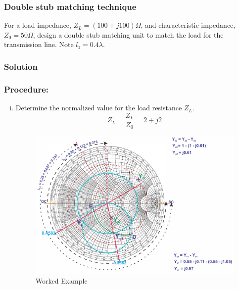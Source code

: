 \begin{exmp}
\subsubsection*{Double stub matching technique}
For a load impedance, $Z_{L} = (100 + j100)\Omega$, and characteristic impedance, $Z_0 = 50\Omega$,  design a double stub matching unit to match the load for the transmission line. Note $l_{1} = 0.4\lambda$.

\subsubsection*{Solution}			
\subsubsection*{Procedure:}
\begin{enumerate}[(i)]
\item Determine the normalized value for the load resistance $Z_{L}$.
\begin{dmath*}
\bar{Z_{L}} = \frac{Z_{L}}{Z_0} = 2 + j2
\end{dmath*}
\begin{figure}[h]
\centering
\includegraphics[width=1\linewidth]{./graphics/question1}
\caption{Worked Example}
\label{fig:question1}
\end{figure}


\end{enumerate}
\end{exmp}
